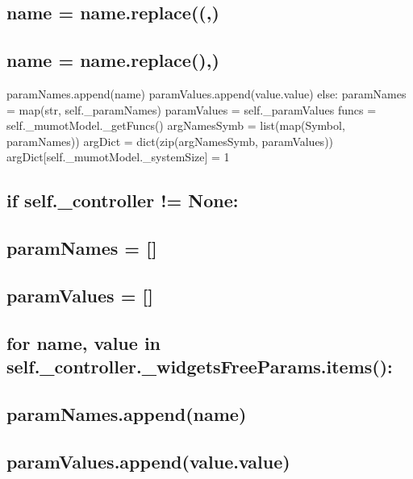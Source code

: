 \subsection*{name = name.\+replace(\textquotesingle{}(\textquotesingle{},\textquotesingle{}\textquotesingle{})}

\subsection*{name = name.\+replace(\textquotesingle{})\textquotesingle{},\textquotesingle{}\textquotesingle{})}

param\+Names.\+append(name) param\+Values.\+append(value.\+value) else\+: param\+Names = map(str, self.\+\_\+param\+Names) param\+Values = self.\+\_\+param\+Values funcs = self.\+\_\+mumot\+Model.\+\_\+get\+Funcs() arg\+Names\+Symb = list(map(\+Symbol, param\+Names)) arg\+Dict = dict(zip(arg\+Names\+Symb, param\+Values)) arg\+Dict\mbox{[}self.\+\_\+mumot\+Model.\+\_\+system\+Size\mbox{]} = 1 

\subsection*{if self.\+\_\+controller != None\+:}

\subsection*{param\+Names = \mbox{[}\mbox{]}}

\subsection*{param\+Values = \mbox{[}\mbox{]}}

\subsection*{for name, value in self.\+\_\+controller.\+\_\+widgets\+Free\+Params.\+items()\+:}

\subsection*{param\+Names.\+append(name)}

\subsection*{param\+Values.\+append(value.\+value)}

